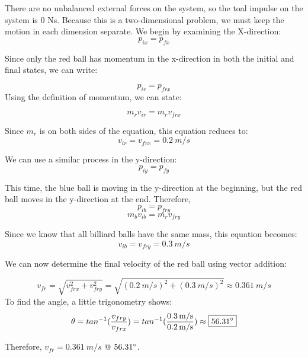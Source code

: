 \begin{mdframed}[backgroundcolor=blue!10!white]
\begin{center}
\begin{tikzpicture}
		\end{tikzpicture}
	\end{center}

	There are no unbalanced external forces on the system, so the toal impulse on the system is 0 Ns.  Because this is a two-dimensional problem, we must keep the motion in each dimension separate.  We begin by examining the X-direction:
	\begin{equation*}
		p_{ix} = p_{fx}
	\end{equation*}

Since only the red ball has momentum in the x-direction in both the initial and final states, we can write:
	
\begin{equation*}
	p_{ir} = p_{frx}
\end{equation*}
Using the definition of momentum, we can state:

\begin{equation*}
	m_r v_{ir} = m_r v_{frx}
\end{equation*}

Since $m_r$ is on both sides of the equation, this equation reduces to:
\begin{equation*}
	v_{ir} = v_{frx} = \boxed{\SI{0.2}{m/s}}
\end{equation*}

We can use a similar process in the y-direction:
\begin{equation*}
	p_{iy} = p_{fy}
\end{equation*}

This time, the blue ball is moving in the y-direction at the beginning, but the red ball moves in the y-direction at the end.  Therefore, 
\begin{equation*}
	p_{ib} = p_{fry}
\end{equation*}
\begin{equation*}
	m_b v_{ib} = m_r v_{fry}
\end{equation*}

Since we know that all billiard balls have the same mass, this equation becomes:
\begin{equation*}
	v_{ib} = v_{fry} = \boxed{\SI{0.3}{m/s}}
\end{equation*}

We can now determine the final velocity of the red ball using vector addition:

\begin{equation*}
	v_{fr} = \sqrt{v_{frx}^2 + v_{fry}^2} =\sqrt{(\SI{0.2}{m/s})^2 + (\SI{0.3}{m/s})^2} \approx \boxed{\SI{0.361}{m/s}}
\end{equation*}	
	To find the angle, a little trigonometry shows:
		\begin{equation*}
		\theta =tan^{-1} (\frac{v_{fry}}{v_{frx}}) = tan^{-1} (\frac{\SI{0.3}{m/s}}{\SI{0.2}{m/s}}) \approx \boxed{56.31 \degree}
			\end{equation*}
	
	Therefore, $v_{fr} = \SI{0.361}{m/s}$ @ $56.31 \degree$.
	
\end{mdframed}
\vspace{0.1in}

